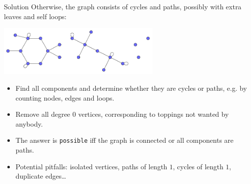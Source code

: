 \begin{frame}
  \frametitle{\problemtitle}
  \begin{block}{Solution}
    Otherwise, the graph consists of cycles and paths, possibly with extra leaves and self loops:
    \begin{center}
      \includegraphics[width=0.6\textwidth]{components.pdf}
    \end{center}
    \pause
    \vspace{-4mm}
    \begin{itemize}
      \item<+-> Find all components and determine whether they are cycles or paths, e.g. by counting nodes, edges and loops.
      \item<+-> Remove all degree $0$ vertices, corresponding to toppings not wanted by anybody.
      \item<+-> The answer is \texttt{possible} iff the graph is connected or all components are paths.
      \item<+-> Potential pitfalls: isolated vertices, paths of length $1$, cycles of length $1$, duplicate edges\dots
    \end{itemize}
  \end{block}
  \solvestats
\end{frame}
